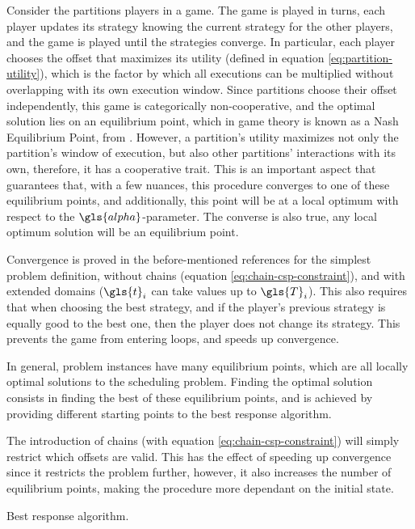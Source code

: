 \documentclass[main.tex]{subfiles}
\begin{document}
Consider the partitions players in a game.
The game is played in turns, each player updates its strategy knowing the current strategy for the other players, and the game is played until the strategies converge.
In particular, each player chooses the offset that maximizes its utility (defined in equation \ref{eq:partition-utility}), which is the factor by which all executions can be multiplied without overlapping with its own execution window.
Since partitions choose their offset independently, this game is categorically non-cooperative, and the optimal solution lies on an equilibrium point, which in game theory is known as a Nash Equilibrium Point, from \textcite{nash1951non}.
However, a partition's utility maximizes not only the partition's window of execution, but also other partitions' interactions with its own, therefore, it has a cooperative trait.
This is an important aspect that guarantees that, with a few nuances, this procedure converges to one of these equilibrium points, and additionally, this point will be at a local optimum with respect to the $\gls{alpha}$-parameter.
The converse is also true, any local optimum solution will be an equilibrium point.

Convergence is proved in the before-mentioned references for the simplest problem definition, without chains (equation \ref{eq:chain-csp-constraint}), and with extended domains ($\gls{t}_i$ can take values up to $\gls{T}_i$).
This also requires that when choosing the best strategy, and if the player's previous strategy is equally good to the best one, then the player does not change its strategy.
This prevents the game from entering loops, and speeds up convergence.

In general, problem instances have many equilibrium points, which are all locally optimal solutions to the scheduling problem.
Finding the optimal solution consists in finding the best of these equilibrium points, and is achieved by providing different starting points to the best response algorithm.

The introduction of chains (with equation \ref{eq:chain-csp-constraint}) will simply restrict which offsets are valid. 
This has the effect of speeding up convergence since it restricts the problem further, however, it also increases the number of equilibrium points, making the procedure more dependant on the initial state.

\begin{algorithm}
    
    \caption{Best response algorithm.}
    \label{alg:best-response}
\end{algorithm}
\end{document}
